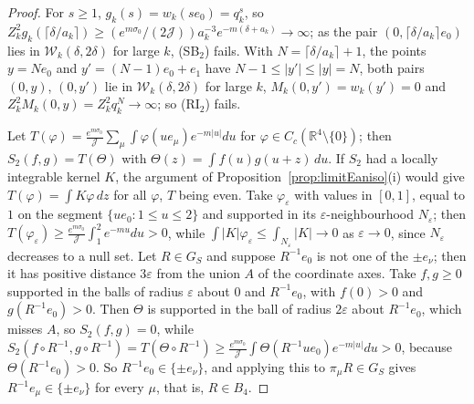 \documentclass[aps,prd,twocolumn,superscriptaddress,nofootinbib,longbibliography,floatfix,amsmath,amssymb,10pt]{revtex4-2}
\theoremstyle{definition}
\theoremstyle{remark}
\newcommand{\R}{\mathbb{R}}
\begin{document}
\begin{proof}
For $s\ge1$, $g_k(s)=w_k(se_0)=q_k^s$, so $Z_k^2g_k(\lceil\delta/a_k\rceil)
\ge(e^{m\sigma_0}/(2\mathcal J))a_k^{-3}e^{-m(\delta+a_k)}\to\infty$; as
the pair $(0,\lceil\delta/a_k\rceil e_0)$ lies in $\mathcal W_k(\delta,
2\delta)$ for large $k$, (SB$_2$) fails. With $N=\lceil
\delta/a_k\rceil+1$, the points $y=Ne_0$ and $y'=(N-1)e_0+e_1$ have
$N-1\le|y'|\le|y|=N$, both pairs $(0,y)$, $(0,y')$ lie in $\mathcal W_k(
\delta,2\delta)$ for large $k$, $M_k(0,y')=w_k(y')=0$ and $Z_k^2M_k(0,y)=
Z_k^2q_k^N\to\infty$; so (RI$_2$) fails.

Let $T(\varphi)=\frac{e^{m\sigma_0}}{\mathcal J}\sum_\mu\int\varphi(ue_\mu)
e^{-m|u|}du$ for $\varphi\in C_c(\R^4\setminus\{0\})$; then $S_2(f,g)=
T(\Theta)$ with $\Theta(z)=\int f(u)g(u+z)\,du$. If $S_2$ had a locally
integrable kernel $K$, the argument of Proposition~\ref{prop:limitEaniso}(i)
would give $T(\varphi)=\int K\varphi\,dz$ for all $\varphi$, $T$ being
even. Take
$\varphi_\varepsilon$ with values in $[0,1]$, equal to $1$ on the segment
$\{ue_0:1\le u\le2\}$ and supported in its $\varepsilon$-neighbourhood
$N_\varepsilon$; then $T(\varphi_\varepsilon)\ge\frac{e^{m\sigma_0}}
{\mathcal J}\int_1^2e^{-mu}du>0$, while $\int|K|\varphi_\varepsilon\le
\int_{N_\varepsilon}|K|\to0$ as $\varepsilon\to0$, since $N_\varepsilon$
decreases to a null set. Let $R\in G_S$ and suppose $R^{-1}e_0$ is not one
of the $\pm e_\nu$; then it has positive distance $3\varepsilon$ from the
union $A$ of the coordinate axes. Take $f,g\ge0$ supported in the balls of
radius $\varepsilon$ about $0$ and $R^{-1}e_0$, with $f(0)>0$ and
$g(R^{-1}e_0)>0$. Then $\Theta$ is supported in the ball of radius
$2\varepsilon$ about $R^{-1}e_0$, which misses $A$, so $S_2(f,g)=0$, while
$S_2(f\circ R^{-1},g\circ R^{-1})=T(\Theta\circ R^{-1})\ge\frac{e^{m
\sigma_0}}{\mathcal J}\int\Theta(R^{-1}ue_0)e^{-m|u|}du>0$, because
$\Theta(R^{-1}e_0)>0$. So $R^{-1}e_0\in\{\pm e_\nu\}$, and applying this to
$\pi_\mu R\in G_S$ gives $R^{-1}e_\mu\in\{\pm e_\nu\}$ for every $\mu$, that
is, $R\in B_4$.


\end{proof}
\end{document}
